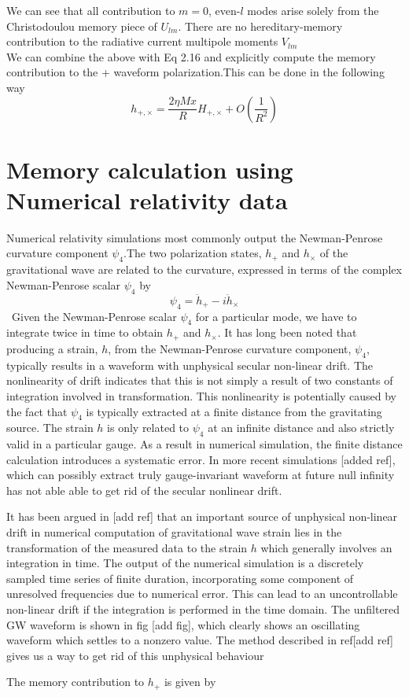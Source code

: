 \documentclass[prd,preprintnumbers,twocolumn,eqsecnum,floatfix,letter]{revtex4}
\begin{document}
We can see that all contribution to $m=0$, even-$l$ modes arise solely from the Christodoulou memory piece of $U_{lm}$. There are no hereditary-memory contribution to the radiative current multipole moments $V_{lm}$\\
We can combine the above with Eq 2.16 and explicitly compute the memory contribution to the + waveform polarization.This can be done in the following way
\begin{equation}
	h_{+,\times} = \frac{2\eta Mx}{R}H_{+,\times} + O\left(\frac{1}{R^2}\right)
\end{equation}

\section{Memory calculation using Numerical relativity data}
Numerical relativity simulations most commonly output the Newman-Penrose curvature component $\psi_4$.The two polarization states, $h_{+}$ and $h_{\times}$ of the gravitational wave are related to the curvature, expressed in terms 	of the complex Newman-Penrose scalar $\psi_4$ by 
\begin{equation}
	\psi_4 = \ddot{h}_+ - \mathit{i}\ddot{h}_{\times}
\end{equation}\
Given the Newman-Penrose scalar $\psi_4$ for a particular mode, we have to integrate twice in time to obtain $h_{+}$ and $h_{\times}$. It has long been noted that producing a strain, $h$, from the Newman-Penrose curvature component, $\psi_4$, typically results in a waveform with unphysical secular non-linear drift. The nonlinearity of drift indicates that this is not simply a result of two constants of integration involved in transformation. This nonlinearity is potentially caused by the fact that $\psi_4$ is typically extracted at a finite distance from the gravitating source. The strain $h$ is only related to $\psi_4$ at an infinite distance and also strictly valid in a particular gauge. As a result in numerical simulation, the finite distance calculation introduces a systematic error. In more recent simulations [added ref], which can possibly extract truly gauge-invariant waveform at future null infinity has not able able to get rid of the secular nonlinear drift.
\par It has been argued in [add ref] that an important source of unphysical non-linear drift in numerical computation of gravitational wave strain lies in the transformation of the measured data to the strain $h$  which generally involves an integration in time. The output of the numerical simulation is a discretely sampled time series of finite duration, incorporating some component of unresolved frequencies due to numerical error. This can lead to an uncontrollable non-linear drift if the integration is performed in the time domain. The unfiltered GW waveform is shown in fig [add fig], which clearly shows an oscillating waveform which settles to a nonzero value. The method described in ref[add ref] gives us a way to get rid of this unphysical behaviour    
\par The memory contribution to $h_{+}$ is given by 
\end{document}
